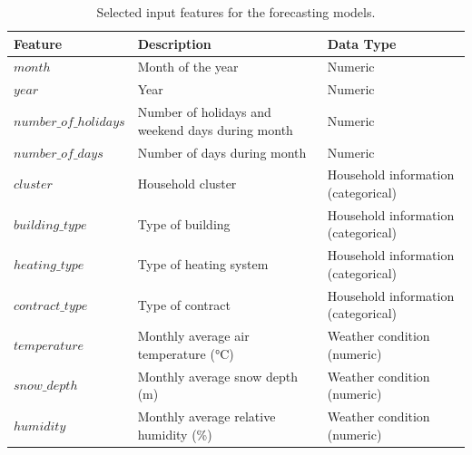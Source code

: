 \begin{table}[h!tbp]%
    \centering
    \caption{Selected input features for the forecasting models.}
    \label{tab:input-variables}
    \small
    \begin{tabularx}{\linewidth}{l L l}
        \textbf{Feature}       & \textbf{Description}                                    & \textbf{Data Type}                  \\
        \midrule
        $month$                & Month of the year                                       & Numeric                             \\
        $year$                 & Year                                                    & Numeric                             \\
        $number\_of\_holidays$ & Number of holidays and weekend days during month        & Numeric                             \\
        $number\_of\_days$     & Number of days during month                             & Numeric                             \\
        \midrule
        $cluster$              & Household cluster                                       & Household information (categorical) \\
        $building\_type$       & Type of building                                        & Household information (categorical) \\
        $heating\_type$        & Type of heating system                                  & Household information (categorical) \\
        $contract\_type$       & Type of contract                                        & Household information (categorical) \\
        \midrule
        $temperature$          & Monthly average air temperature (\unit{\degreeCelsius}) & Weather condition (numeric)         \\
        $snow\_depth$          & Monthly average snow depth (m)                          & Weather condition (numeric)         \\
        $humidity$             & Monthly average relative humidity (\%)                  & Weather condition (numeric)         \\

\end{tabularx}
\end{table}
